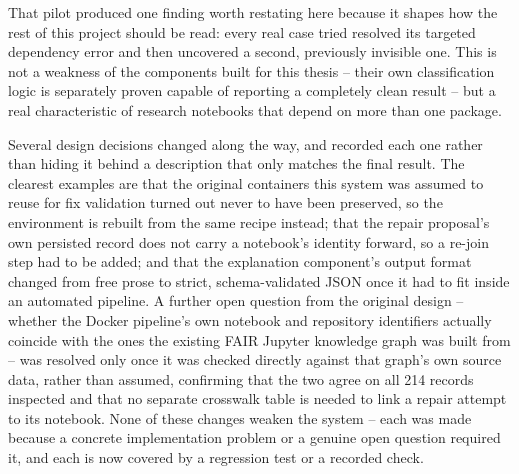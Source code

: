 
That pilot produced one finding worth restating here because it shapes how
the rest of this project should be read: every real case tried resolved its
targeted dependency error and then uncovered a second, previously invisible
one. This is not a weakness of the components built for this thesis --
their own classification logic is separately proven capable of reporting a
completely clean result -- but a real characteristic of research notebooks
that depend on more than one package.


Several design decisions changed along the way, and 
recorded each one rather than hiding it behind a description that only
matches the final result. The clearest examples are that the original
containers this system was assumed to reuse for fix validation turned out
never to have been preserved, so the environment is rebuilt from the same
recipe instead; that the repair proposal's own persisted record does not
carry a notebook's identity forward, so a re-join step had to be added; and
that the explanation component's output format changed from free prose to
strict, schema-validated JSON once it had to fit inside an automated
pipeline. A further open question from the original design -- whether the
Docker pipeline's own notebook and repository identifiers actually coincide
with the ones the existing FAIR Jupyter knowledge graph was built from --
was resolved only once it was checked directly against that graph's own
source data, rather than assumed, confirming that the two agree on all 214
records inspected and that no separate crosswalk table is needed to link a
repair attempt to its notebook. None of these changes weaken the system --
each was made because a concrete implementation problem or a genuine open
question required it, and each is now covered by a regression test or a
recorded check.

